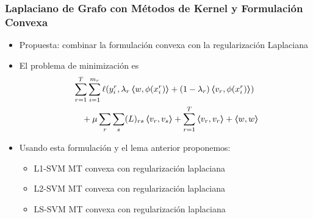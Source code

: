 \documentclass[aspectratio=43]{beamer}
\newcommand{\dotp}[2]{\bm{\left\langle} #1, #2 \bm{\right\rangle}}
\newcommand{\ntasks}{T}
\newcommand{\npertask}{m}
\newcommand{\lossf}{\ell}
\begin{document}
\begin{frame}
      \frametitle{Laplaciano de Grafo con Métodos de Kernel y Formulación Convexa}
      \begin{itemize}
            \item Propuesta: combinar la formulación convexa con la regularización Laplaciana
            \item El problema de minimización es
            \begin{equation}
                  \nonumber%
                  \begin{aligned}
                       & \sum_{r=1}^{\ntasks} \sum_{i=1}^{\npertask_r} \lossf(y_i^r, \lambda_r \dotp{w}{\phi(x_i^r)} + (1- \lambda_r) \dotp{ v_r}{\phi(x_i^r)}) \\
                       &\quad + \mu \sum_r \sum_s (L)_{rs} \dotp{v_r}{v_s} + \sum_{r=1}^\ntasks \dotp{v_r}{v_r} + \dotp{w}{w} \\
                  \end{aligned}
            \end{equation}
            \item Usando esta formulación y el lema anterior proponemos:
            \begin{itemize}
                  \item L1-SVM MT convexa con regularización laplaciana
                  \item L2-SVM MT convexa con regularización laplaciana
                  \item LS-SVM MT convexa con regularización laplaciana
            \end{itemize}
            
      \end{itemize}
      

\end{frame}
\end{document}
